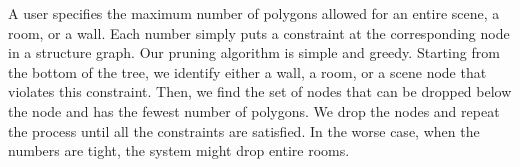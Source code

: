 A user specifies the maximum number of polygons allowed for an entire
scene, a room, or a wall. Each number simply puts a constraint at the
corresponding node in a structure graph. Our pruning algorithm is simple
and greedy. Starting from the bottom of the tree, we identify either a
wall, a room, or a scene node that violates this constraint. Then, we
find the set of nodes that can be dropped below the node and has the
fewest number of polygons. We drop the nodes and repeat the process
until all the constraints are satisfied. In the worse case, when the
numbers are tight, the system might drop entire rooms.
